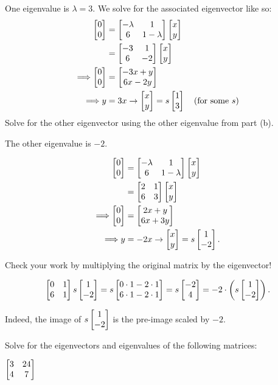 \documentclass[../gatm_answers.tex]{subfiles}
\begin{document}
\begin{inner_problem}
\item One eigenvalue is $\lambda=3$. We solve for the associated eigenvector like so:
\begin{align*}
\begin{bmatrix} 0 \\ 0 \end{bmatrix} &= \begin{bmatrix} -\lambda & 1 \\ 6 & 1-\lambda \end{bmatrix}\begin{bmatrix} x \\ y \end{bmatrix} \\
&= \begin{bmatrix} -3 & 1 \\ 6 & -2 \end{bmatrix}\begin{bmatrix} x \\ y \end{bmatrix} \\
\Longrightarrow \begin{bmatrix} 0 \\ 0 \end{bmatrix} &= \begin{bmatrix} -3x+y \\ 6x-2y \end{bmatrix} \\
\Longrightarrow y&=3x \rightarrow \begin{bmatrix} x \\ y \end{bmatrix}=s\begin{bmatrix} 1 \\ 3 \end{bmatrix}\quad \text{(for some }s\text{)}
\end{align*}
Solve for the other eigenvector using the other eigenvalue from part (b).
\end{inner_problem}

The other eigenvalue is $-2$.

\begin{align*}
\begin{bmatrix} 0 \\ 0 \end{bmatrix} &= \begin{bmatrix} -\lambda & 1 \\ 6 & 1-\lambda \end{bmatrix}\begin{bmatrix} x \\ y \end{bmatrix} \\
&= \begin{bmatrix} 2 & 1 \\ 6 & 3 \end{bmatrix}\begin{bmatrix} x \\ y \end{bmatrix} \\
\Longrightarrow \begin{bmatrix} 0 \\ 0 \end{bmatrix} &= \begin{bmatrix} 2x+y \\ 6x+3y \end{bmatrix} \\
\Longrightarrow y&=-2x \rightarrow \begin{bmatrix} x \\ y \end{bmatrix}=s\begin{bmatrix} 1 \\ -2 \end{bmatrix}.
\end{align*}

\begin{inner_problem}
\item Check your work by multiplying the original matrix by the eigenvector!
\end{inner_problem}

$$\begin{bmatrix} 0 & 1 \\ 6 & 1 \end{bmatrix}s\begin{bmatrix} 1 \\ -2 \end{bmatrix} = s\begin{bmatrix} 0\cdot 1 - 2\cdot 1 \\ 6\cdot 1 - 2\cdot 1 \end{bmatrix} = s\begin{bmatrix} -2 \\ 4 \end{bmatrix} = -2\cdot\left(s\begin{bmatrix} 1 \\ -2 \end{bmatrix}\right).$$

Indeed, the image of $s\begin{bmatrix} 1 \\ -2 \end{bmatrix}$ is the pre-image scaled by $-2$.

\begin{outer_problem}
\item Solve for the eigenvectors and eigenvalues of the following matrices:
\end{outer_problem}

\begin{inner_problem}[start=1]
\item $\begin{bmatrix} 3 & 24 \\ 4 & 7 \end{bmatrix}$
\end{inner_problem}
\end{document}
